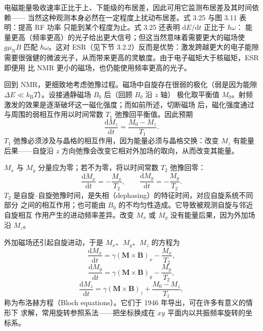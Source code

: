 电磁能量吸收速率正比于上、下能级的布居差，因此可用它监测布居差及其时间依赖——
当然这种观测本身必然在一定程度上扰动布居差。式 3.25 与图 3.11 表明：提高 RF 功率
只能到某个程度为止。式 3.25 还表明 $\mathrm{d}E/\mathrm{d}t$ 正比于 $\hbar\omega$：
能量更高（频率更高）的光子给出更大信号；但这当然意味着需要更大的磁场使 $g\mu_{\mathrm{N}}B$
匹配 $\hbar\omega$。这对 ESR（见下节 3.2.2）反而是优势：激发跨越更大的电子能隙
需要很强健的微波光子，从而带来更高的灵敏度。由于电子磁矩大于核磁矩，ESR 即便用
比 NMR 更小的磁场，也仍能使用频率更高的光子。

回到 NMR，更细致地考虑弛豫过程。磁场中自旋存在很弱的极化（弱是因为能隙
$\Delta E\ll k_{\mathrm{B}}T$）。设接通静磁场 $B_0$ 后（回顾 $B_0$ 沿 $z$ 轴）
极化取平衡值 $M_0$。射频激发的效果是逐渐破坏这一磁化强度；而如前所述，切断磁场
后，磁化强度通过与周围的弱相互作用以时间常数 $T_1$ 弛豫回平衡值。因此预期
\begin{equation*}
\frac{\mathrm{d}M_z}{\mathrm{d}t} = \frac{M_0-M_z}{T_1}.\tag{3.26}
\end{equation*}
$T_1$ 弛豫必须涉及与晶格的相互作用，因为能量必须与晶格交换：改变 $M_z$ 有能量
后果——自旋沿 $z$ 方向弛豫会改变它相对外加场的取向，从而改变其能量。

$M_x$ 与 $M_y$ 分量应为零；若不为零，将以时间常数 $T_2$ 弛豫回零：
\begin{equation*}
\frac{\mathrm{d}M_x}{\mathrm{d}t} = -\frac{M_x}{T_2},\qquad
\frac{\mathrm{d}M_y}{\mathrm{d}t} = -\frac{M_y}{T_2}.\tag{3.27}
\end{equation*}
$T_2$ 是自旋--自旋弛豫时间，是失相（dephasing）的特征时间，对应自旋系统不同部分
之间的相互作用；也可能由 $B_0$ 的不均匀性造成。它导致被观测自旋与邻近自旋相互
作用产生的进动频率差异。改变 $M_x$ 或 $M_y$ 没有能量后果，因为外加场沿 $M_z$。

外加磁场还引起自旋进动，于是 $M_x$、$M_y$、$M_z$ 的方程为
\begin{equation*}
\frac{\mathrm{d}M_x}{\mathrm{d}t} = \gamma(\mathbf{M}\times\mathbf{B})_x - \frac{M_x}{T_2},\tag{3.28}
\end{equation*}
\begin{equation*}
\frac{\mathrm{d}M_y}{\mathrm{d}t} = \gamma(\mathbf{M}\times\mathbf{B})_y - \frac{M_y}{T_2},\tag{3.29}
\end{equation*}
\begin{equation*}
\frac{\mathrm{d}M_z}{\mathrm{d}t} = \gamma(\mathbf{M}\times\mathbf{B})_z + \frac{M_0-M_z}{T_1},\tag{3.30}
\end{equation*}
称为布洛赫方程（Bloch equations）。它们于 1946 年导出，可在许多有意义的情形下
求解，常用旋转参照系法——把坐标换成在 $xy$ 平面内以共振频率旋转的坐标系。

